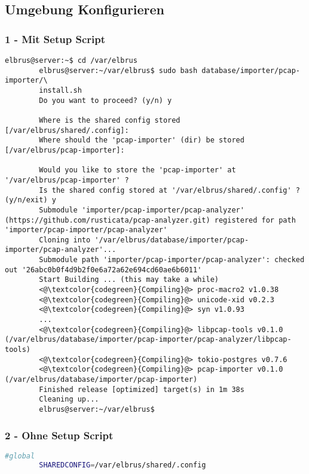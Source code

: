 \documentclass{article}
\begin{document}
	\subsection[file config]{Umgebung Konfigurieren}
	\subsubsection{1 - Mit Setup Script}
	\begin{lstlisting}[caption={Ausführen des 'install.sh' Scripts.}, breaklines=true,]
		elbrus@server:~$ cd /var/elbrus
		elbrus@server:~/var/elbrus$ sudo bash database/importer/pcap-importer/\
		install.sh
		Do you want to proceed? (y/n) y
		
		Where is the shared config stored [/var/elbrus/shared/.config]: 
		Where should the 'pcap-importer' (dir) be stored [/var/elbrus/pcap-importer]: 
		
		Would you like to store the 'pcap-importer' at '/var/elbrus/pcap-importer' ?
		Is the shared config stored at '/var/elbrus/shared/.config' ? (y/n/exit) y
		Submodule 'importer/pcap-importer/pcap-analyzer' (https://github.com/rusticata/pcap-analyzer.git) registered for path 'importer/pcap-importer/pcap-analyzer'
		Cloning into '/var/elbrus/database/importer/pcap-importer/pcap-analyzer'...
		Submodule path 'importer/pcap-importer/pcap-analyzer': checked out '26abc0b0f4d9b2f0e6a72a62e694cd60ae6b6011'
		Start Building ... (this may take a while)
		<@\textcolor{codegreen}{Compiling}@> proc-macro2 v1.0.38
		<@\textcolor{codegreen}{Compiling}@> unicode-xid v0.2.3
		<@\textcolor{codegreen}{Compiling}@> syn v1.0.93
		...
		<@\textcolor{codegreen}{Compiling}@> libpcap-tools v0.1.0 (/var/elbrus/database/importer/pcap-importer/pcap-analyzer/libpcap-tools)
		<@\textcolor{codegreen}{Compiling}@> tokio-postgres v0.7.6
		<@\textcolor{codegreen}{Compiling}@> pcap-importer v0.1.0 (/var/elbrus/database/importer/pcap-importer)
		Finished release [optimized] target(s) in 1m 38s
		Cleaning up...
		elbrus@server:~/var/elbrus$
	\end{lstlisting}
	
	\newpage
	\subsubsection{2 - Ohne Setup Script}	
	\lstset{style=files}
	\begin{lstlisting}[caption={Anhand von '.env.example' eigene '.env' Datei anlegen.}, language=bash]
		#global
		SHAREDCONFIG=/var/elbrus/shared/.config
	\end{lstlisting}
\end{document}
